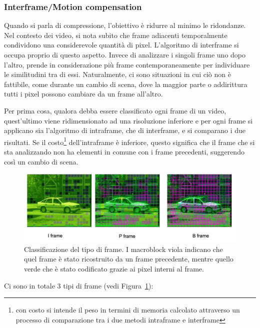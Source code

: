 \documentclass[a4paper,12pt, oneside]{article}
\begin{document}
\subsubsection{Interframe/Motion compensation}
Quando si parla di compressione, l'obiettivo è ridurre al minimo le ridondanze. Nel contesto dei video,
si nota subito che frame adiacenti temporalmente condividono una considerevole quantità di pixel.
L'algoritmo di interframe si occupa proprio di questo aspetto. Invece di analizzare i singoli frame uno
dopo l'altro, prende in considerazione più frame contemporaneamente per individuare le similitudini tra
di essi. Naturalmente, ci sono situazioni in cui ciò non è fattibile, come durante un cambio di scena,
dove la maggior parte o addirittura tutti i pixel possono cambiare da un frame all'altro.

Per prima cosa, qualora debba essere classificato ogni frame di un video, quest'ultimo viene
ridimensionato ad una risoluzione inferiore e per ogni frame si applicano sia l'algoritmo di intraframe,
che di interframe, e si comparano i due risultati. Se il costo\footnote{con costo si intende il peso
in termini di memoria calcolato attraverso un processo di comparazione tra i due metodi intraframe e interframe}
dell'intraframe è inferiore, questo
significa che il frame che si sta analizzando non ha elementi in comune con i frame precedenti,
suggerendo così un cambio di scena.

\begin{figure}[h]
    \centering
    \includegraphics[width=1\textwidth]{images/frame-type.png}
    \caption{Classificazione del tipo di frame.
    I macroblock viola indicano che quel frame è stato ricostruito da un frame precedente,
    mentre quello verde che è stato codificato grazie ai pixel interni al frame.}
    \label{fig:frame_type}
\end{figure}

\noindent Ci sono in totale 3 tipi di frame (vedi Figura~\ref{fig:frame_type}):
\end{document}

